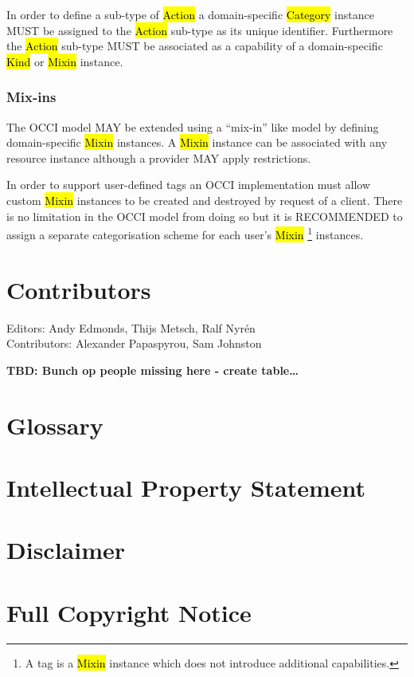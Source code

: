 \documentclass[10pt,a4paper,british]{article}
\begin{document}
In order to define a sub-type of \hl{Action} a domain-specific \hl{Category}
instance MUST be assigned to the \hl{Action} sub-type as its unique identifier.
Furthermore the \hl{Action} sub-type MUST be associated as a capability of a
domain-specific \hl{Kind} or \hl{Mixin} instance.

\subsubsection{Mix-ins}
The OCCI model MAY be extended using a ``mix-in'' like model by defining
domain-specific \hl{Mixin} instances.  A \hl{Mixin} instance can be associated
with any resource instance although a provider MAY apply restrictions.

In order to support user-defined tags an OCCI implementation must allow custom
\hl{Mixin} instances to be created and destroyed by request of a client.
There is no limitation in the OCCI model from doing so but it is RECOMMENDED to
assign a separate categorisation scheme for each user's \hl{Mixin}%
\footnote{A tag is a \hl{Mixin} instance which does not introduce additional
capabilities.}
instances.

\section{Contributors}
Editors: Andy Edmonds, Thijs Metsch, Ralf Nyrén \\
Contributors: Alexander Papaspyrou, Sam Johnston

\textbf{TBD: Bunch op people missing here - create table\ldots}

\section{Glossary}
\label{sec:glossary}



\section{Intellectual Property Statement}


\section{Disclaimer}


\section{Full Copyright Notice}

\end{document}
